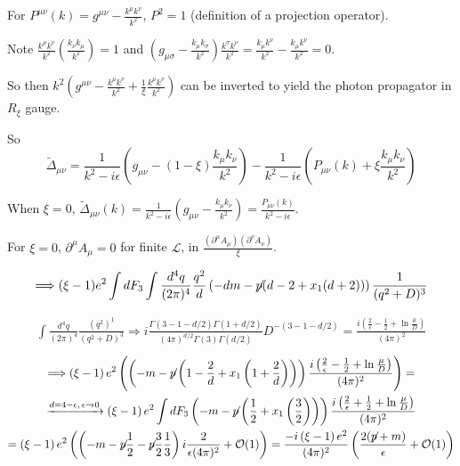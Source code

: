 \documentclass[twoside]{amsart}
\newcommand{\solutionhead}[1]
  {\smallskip
   \noindent{\large\bf Solution #1.}
   }
\begin{document}
For $P^{\mu \nu}(k) = g^{\mu \nu} - \frac{k^{\mu} k^{\nu}}{k^2}$, $P^2=1$ (definition of a projection operator).  

Note $\frac{k^{\mu} k^{\nu}}{k^2} \left( \frac{k_{\nu} k_{\mu}}{k^2} \right) =1$ and $\left( g_{\mu \sigma}  - \frac{k_{\mu} k_{\sigma}}{k^2} \right) \frac{k^{\sigma} k^{\nu}}{ k^2} = \frac{k_{\mu} k^{\nu}}{k^2} - \frac{k_{\mu} k^{\nu}}{k^2 } = 0 $.  

So then $k^2 \left( g^{\mu \nu}  -\frac{k^{\mu } k^{\nu}}{k^2} + \frac{1}{ \xi} \frac{k^{\mu} k^{\nu}}{ k^2} \right)$ can be inverted to yield the photon propagator in $R_{\xi}$ gauge.  

So
\[
\widetilde{\Delta}_{\mu \nu} = \frac{1}{k^2 - i \epsilon } \left( g_{\mu \nu} - (1- \xi) \frac{k_{\mu} k_{\nu}}{k^2 } \right) - \frac{1}{ k^2 - i\epsilon } \left( P_{\mu \nu}(k) + \xi \frac{k_{\mu} k_{\nu}}{k^2 } \right) 
\]

When $\xi = 0$, $\widetilde{\Delta}_{\mu \nu}(k) = \frac{1}{ k^2 - i\epsilon } \left( g_{\mu \nu} - \frac{k_{\mu} k_{\nu}}{k^2 } \right) = \frac{P_{\mu \nu}(k) }{k^2 - i \epsilon }$.  

For $\xi =0$, $\partial^{\mu} A_{\mu} = 0$ for finite $\mathcal{L}$, in $\frac{ (\partial^{\mu} A_{\mu} )(\partial^{\nu} A_{\nu}) }{ \xi}$.  

\solutionhead{62.2}

\[
\Longrightarrow (\xi -1) e^2 \int dF_3 \int \frac{d^4 q}{ (2\pi)^4} \frac{q^2}{d} \left( -dm - {\not}{p} (d- 2 + x_1(d+2)) \right) \frac{1}{ (q^2 + D)^3}
\]

\[
\begin{gathered}
  \int \frac{d^4q}{(2\pi)^4} \frac{(q^2)^1}{ (q^2 + D)^3} \Longrightarrow  i\frac{\Gamma(3-1 -d/2) \Gamma(1 + d/2) }{ (4\pi)^{d/2} \Gamma(3) \Gamma(d/2) } D^{-(3-1 - d/2) } = 
    \frac{ i \left( \frac{2}{\epsilon} - \frac{1}{2} + \ln{ \frac{\mu}{D}} \right) }{ (4\pi)^2} 
\end{gathered}
\]
\[
\begin{gathered}
\Longrightarrow   \left( \xi - 1 \right) e^2 \left( \left( - m - {\not}{p} \left( 1  - \frac{2}{d} + x_1 \left( 1  + \frac{2}{d} \right) \right) \right) \frac{ i \left( \frac{2}{\epsilon }- \frac{1}{2} + \ln{ \frac{\mu }{ D} } \right) }{ (4\pi)^2 } \right) =  \\
  \xrightarrow{ d = 4 - \epsilon , \, \epsilon \to 0 } \left( \xi - 1 \right) e^2 \int dF_3 \left( - m - {\not}{p} \left( \frac{1}{2} + x_1 \left( \frac{3}{2} \right) \right) \right) \frac{ i \left( \frac{2}{ \epsilon } + \frac{1}{2} + \ln{ \frac{\mu}{D} } \right) }{ (4\pi)^2 } \\   = \left( \xi -1 \right) e^2 \left(  \left( - m - {\not}{p} \frac{1}{2} - {\not}{p} \frac{3}{2} \frac{1}{3} \right) i \frac{2}{ \epsilon (4\pi)^2 } + \mathcal{O}(1) \right) = \frac{ - i \left( \xi -1 \right) e^2}{(4\pi)^2 } \left( \frac{ 2 ( {\not}{p} + m ) }{\epsilon } + \mathcal{O}(1) \right)
\end{gathered}
\]
\end{document}
